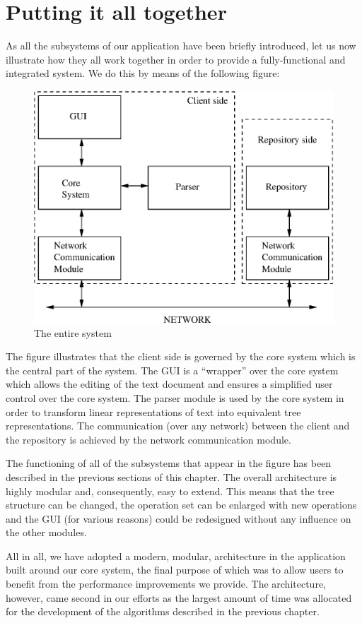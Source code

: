\section{Putting it all together}

As all the subsystems of our application have been briefly introduced, let us now
illustrate how they all work together in order to provide a fully-functional and integrated
system. We do this by means of the following figure:

\begin{figure}[htb]
\begin{center}
\includegraphics{img/system.eps}
\end{center}
\caption{The entire system}
\label{fig:system}
\end{figure}

The figure illustrates that the client side is governed by the core system which is the
central part of the system. The GUI is a ``wrapper'' over the core system which allows
the editing of the text document and ensures a simplified user control over the core
system. The parser module is used by the core system in order to transform linear
representations of text into equivalent tree representations. The communication (over
any network) between the client and the repository is achieved by the network communication
module.

The functioning of all of the subsystems that appear in the figure has been described
in the previous sections of this chapter. The overall architecture is highly modular and,
consequently, easy to extend. This means that the tree structure can be changed, the
operation set can be enlarged with new operations and the GUI (for various reasons) could be
redesigned without any influence on the other modules.

All in all, we have adopted a modern, modular, architecture in the application built
around our core system, the final purpose of which was to allow users to benefit from
the performance improvements we provide. The architecture, however, came second
in our efforts as the largest amount of time was allocated for the development of
the algorithms described in the previous chapter.